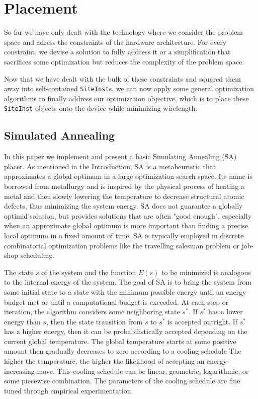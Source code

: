 
\section{Placement}
\label{sec:placement}
So far we have only dealt with the technology where we consider the problem space and adress the constraints of the hardware architecture. 
For every constraint, we devise a solution to fully address it or a simplification that sacrifices some optimization but reduces the complexity of the problem space. 

Now that we have dealt with the bulk of these constraints and squared them away into self-contained \texttt{SiteInst}s, we can now apply some general optimization algorithms to finally address our optimization objective, which is to place these \texttt{SiteInst} objects onto the device while minimizing wirelength. 

\subsection{Simulated Annealing}
\label{subsec:simulated_annealing}

In this paper we implement and present a basic Simulating Annealing (SA) placer. 
As mentioned in the Introduction, SA is a metaheuristic that approximates a global optimum in a large optimization search space. 
Its name is borrowed from metallurgy and is inspired by the physical process of heating a metal and then slowly lowering the temperature to decrease structural atomic defects, thus minimizing the system energy. 
SA does not guarantee a globally optimal solution, but provides solutions that are often "good enough", especially when an approximate global optimum is more important than finding a precise local optimum in a fixed amount of time. 
SA is typically employed in discrete combinatorial optimization problems like the travelling salesman problem or job-shop scheduling. 

The state \(s\) of the system and the function \(E(s)\) to be minimized is analogous to the internal energy of the system. 
The goal of SA is to bring the system from some initial state to a state with the minimum possible energy until an energy budget met or until a computational budget is exceeded.
At each step or iteration, the algorithm considers some neighboring state \(s^*\). 
If \(s^*\) has a lower energy than \(s\), then the state transition from \(s\) to \(s^*\) is accepted outright.
If \(s^*\) has a higher energy, then it can be probabilistically accepted depending on the current global temperature.
The global temperature starts at some positive amount then gradually decreases to zero according to a cooling schedule
The higher the temperature, the higher the likelihood of accepting an energy-increasing move. 
This cooling schedule can be linear, geometric, logarithmic, or some piecewise combination. 
The parameters of the cooling schedule are fine tuned through empirical experimentation. 

